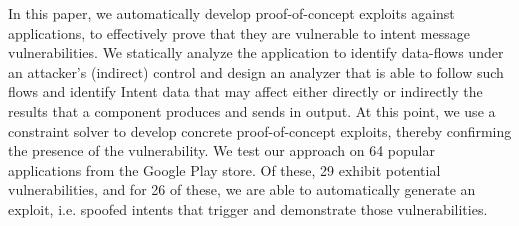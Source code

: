 In this paper, we automatically develop proof-of-concept exploits against applications, to effectively prove that they are vulnerable to intent message vulnerabilities. We statically analyze the application to identify data-flows under an attacker's (indirect) control and design an analyzer that is able to follow such flows and identify Intent data that may affect either directly or indirectly the results that a component produces and sends in output. At this point, we use a constraint solver to develop concrete proof-of-concept exploits, thereby confirming the presence of the vulnerability. We test our approach on 64 popular applications from the Google Play store. Of these, 29 exhibit potential vulnerabilities, and for 26 of these, we are able to automatically generate an exploit, i.e. spoofed intents that trigger and demonstrate those vulnerabilities. 
